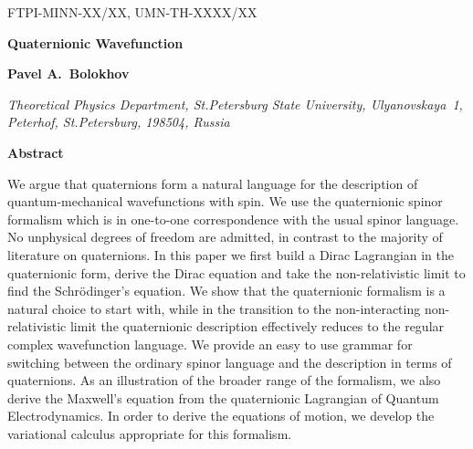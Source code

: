\documentclass[epsfig,12pt]{article}
\begin{document}
\begin{titlepage}


\begin{flushright}
FTPI-MINN-XX/XX, UMN-TH-XXXX/XX\\
\end{flushright}

\vskip 2cm
\begin{center}
{  \Large \bf  Quaternionic Wavefunction }
\end{center}
\vskip 0.5cm

\begin{center}

 {\large
 \bf   Pavel A.~Bolokhov
 }
\end {center}

\begin{center}
{\it Theoretical Physics Department, St.Petersburg State University, Ulyanovskaya~1, 
	Peterhof, St.Petersburg, 198504, Russia}
\end{center}




\begin{center}
{\large\bf Abstract}
\end{center}

\hspace{0.3cm}
	We argue that quaternions form a natural language for the description of
	quantum-mechanical wavefunctions with spin.
	We use the quaternionic spinor formalism which is in one-to-one correspondence with the usual
	spinor language.
	No unphysical degrees of freedom are admitted, in contrast to the majority of literature on quaternions.
	In this paper we first build a Dirac Lagrangian in the quaternionic form,
	derive the Dirac equation and take the non-relativistic limit to find the Schr\"odinger's equation.
	We show that the quaternionic formalism is a natural choice to start with,
	while in the transition to the non-interacting non-relativistic limit the quaternionic description 
	effectively reduces to the regular complex wavefunction language.
	We provide an easy to use grammar for switching between the ordinary spinor language
	and the description in terms of quaternions.
	As an illustration of the broader range of the formalism,
	we also derive the Maxwell's equation from the quaternionic Lagrangian of Quantum Electrodynamics.
	In order to derive the equations of motion, we develop the variational calculus
	appropriate for this formalism.
\vspace{2cm}


\end{titlepage}
\end{document}
